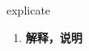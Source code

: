 
\begin{frame}
{\huge explicate}
\begin{center}
\begin{enumerate}\Large
  \item \textbf{解释，说明}
\end{enumerate}
\end{center}
\end{frame}
